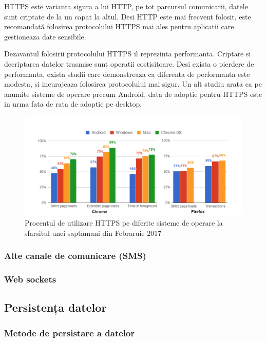 \documentclass[12pt]{article}
\begin{document}
HTTPS este varianta sigura a lui HTTP, pe tot parcursul comunicarii, datele sunt criptate de la un capat la altul.
Desi HTTP este mai frecvent folosit, este recomandată folosirea protocolului HTTPS mai ales pentru aplicatii 
care gestioneaza date sensibile.

Dezavantul folosirii protocolului HTTPS il reprezinta performanta. Criptare si decriptarea datelor trasmise sunt
operatii costisitoare. Desi exista o pierdere de performanta, exista studii \cite{goldberg1998comparison} care demonstreaza
ca diferenta de performanta este modesta, si incurajeaza folosirea protocolului mai sigur. Un alt studiu \cite{felt2017measuring}
arata ca pe anumite sisteme de operare precum Android, data de adoptie pentru HTTPS este in urma fata de rata de adoptie
pe desktop. 

\begin{figure}[H]
\centering
\includegraphics{http.png}
\caption{Procentul de utilizare HTTPS pe diferite sisteme de operare la sfarsitul unei saptamani din
Febraruie 2017 \cite{felt2017measuring}}
\end{figure}

\subsubsection{Alte canale de comunicare (SMS)}
\subsubsection{Web sockets}

\subsection{Persistența datelor}
\subsubsection{Metode de persistare a datelor}
\end{document}
